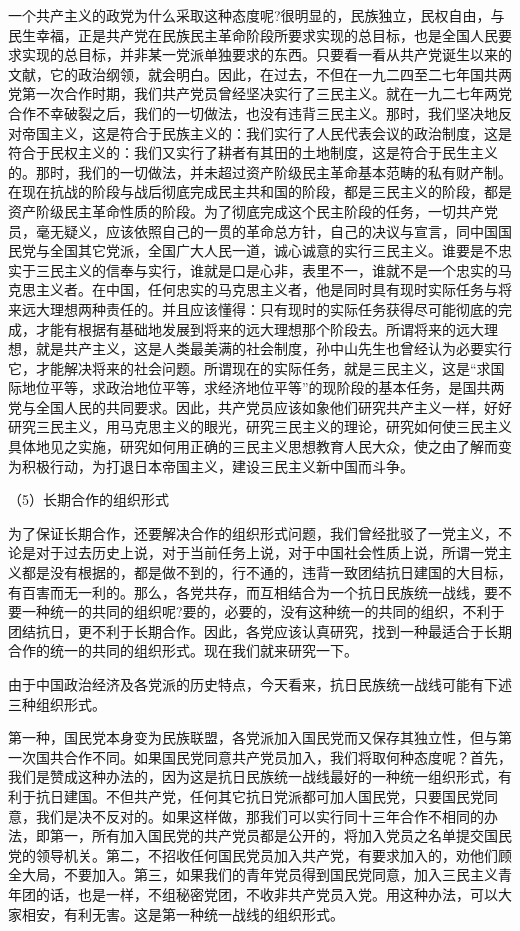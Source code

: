 \documentclass[UTF8, 12pt, a4paper]{ctexrep}
\begin{document}
一个共产主义的政党为什么采取这种态度呢?很明显的，民族独立，民权自由，与民生幸福，正是共产党在民族民主革命阶段所要求实现的总目标，也是全国人民要求实现的总目标，并非某一党派单独要求的东西。只要看一看从共产党诞生以来的文献，它的政治纲领，就会明白。因此，在过去，不但在一九二四至二七年国共两党第一次合作时期，我们共产党员曾经坚决实行了三民主义。就在一九二七年两党合作不幸破裂之后，我们的一切做法，也没有违背三民主义。那时，我们坚决地反对帝国主义，这是符合于民族主义的：我们实行了人民代表会议的政治制度，这是符合于民权主义的：我们又实行了耕者有其田的土地制度，这是符合于民生主义的。那时，我们的一切做法，并未超过资产阶级民主革命基本范畴的私有财产制。在现在抗战的阶段与战后彻底完成民主共和国的阶段，都是三民主义的阶段，都是资产阶级民主革命性质的阶段。为了彻底完成这个民主阶段的任务，一切共产党员，毫无疑义，应该依照自己的一贯的革命总方针，自己的决议与宣言，同中国国民党与全国其它党派，全国广大人民一道，诚心诚意的实行三民主义。谁要是不忠实于三民主义的信奉与实行，谁就是口是心非，表里不一，谁就不是一个忠实的马克思主义者。在中国，任何忠实的马克思主义者，他是同时具有现时实际任务与将来远大理想两种责任的。并且应该懂得：只有现时的实际任务获得尽可能彻底的完成，才能有根据有基础地发展到将来的远大理想那个阶段去。所谓将来的远大理想，就是共产主义，这是人类最美满的社会制度，孙中山先生也曾经认为必要实行它，才能解决将来的社会问题。所谓现在的实际任务，就是三民主义，这是“求国际地位平等，求政治地位平等，求经济地位平等”的现阶段的基本任务，是国共两党与全国人民的共同要求。因此，共产党员应该如象他们研究共产主义一样，好好研究三民主义，用马克思主义的眼光，研究三民主义的理论，研究如何使三民主义具体地见之实施，研究如何用正确的三民主义思想教育人民大众，使之由了解而变为积极行动，为打退日本帝国主义，建设三民主义新中国而斗争。

（5）长期合作的组织形式

为了保证长期合作，还要解决合作的组织形式问题，我们曾经批驳了一党主义，不论是对于过去历史上说，对于当前任务上说，对于中国社会性质上说，所谓一党主义都是没有根据的，都是做不到的，行不通的，违背一致团结抗日建国的大目标，有百害而无一利的。那么，各党共存，而互相结合为一个抗日民族统一战线，要不要一种统一的共同的组织呢?要的，必要的，没有这种统一的共同的组织，不利于团结抗日，更不利于长期合作。因此，各党应该认真研究，找到一种最适合于长期合作的统一的共同的组织形式。现在我们就来研究一下。

由于中国政治经济及各党派的历史特点，今天看来，抗日民族统一战线可能有下述三种组织形式。

第一种，国民党本身变为民族联盟，各党派加入国民党而又保存其独立性，但与第一次国共合作不同。如果国民党同意共产党员加入，我们将取何种态度呢？首先，我们是赞成这种办法的，因为这是抗日民族统一战线最好的一种统一组织形式，有利于抗日建国。不但共产党，任何其它抗日党派都可加人国民党，只要国民党同意，我们是决不反对的。如果这样做，那我们可以实行同十三年合作不相同的办法，即第一，所有加入国民党的共产党员都是公开的，将加入党员之名单提交国民党的领导机关。第二，不招收任何国民党员加入共产党，有要求加入的，劝他们顾全大局，不要加入。第三，如果我们的青年党员得到国民党同意，加入三民主义青年团的话，也是一样，不组秘密党团，不收非共产党员入党。用这种办法，可以大家相安，有利无害。这是第一种统一战线的组织形式。
\end{document}
